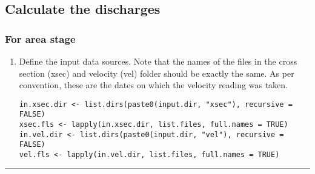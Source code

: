 \documentclass[a4paper]{article}
\begin{document}
\subsection*{Calculate the discharges}
\label{sec:orgcee8e38}

\subsubsection*{For area stage}
\label{sec:org208d09e}

\begin{enumerate}
\item Define the input data sources. Note that the names of the files in the cross section (xsec) and velocity (vel) folder should be exactly the same. As per convention, these are the dates on which the velocity reading was taken.

\begin{verbatim}
in.xsec.dir <- list.dirs(paste0(input.dir, "xsec"), recursive = FALSE)
xsec.fls <- lapply(in.xsec.dir, list.files, full.names = TRUE)
in.vel.dir <- list.dirs(paste0(input.dir, "vel"), recursive = FALSE)
vel.fls <- lapply(in.vel.dir, list.files, full.names = TRUE)
\end{verbatim}
\end{enumerate}



\noindent\rule{\textwidth}{0.5pt}
\end{document}
